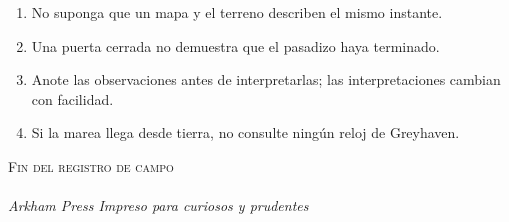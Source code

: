 \begin{enumerate}
  \item No suponga que un mapa y el terreno describen el mismo instante.
  \item Una puerta cerrada no demuestra que el pasadizo haya terminado.
  \item Anote las observaciones antes de interpretarlas; las interpretaciones cambian con facilidad.
  \item Si la marea llega desde tierra, no consulte ningún reloj de Greyhaven.
\end{enumerate}

\vfill
\begin{center}
  \textsc{Fin del registro de campo}\\[1em]
  \PulpBarcode\\[1em]
  \textit{Arkham Press \textbullet{} Impreso para curiosos y prudentes}
\end{center}
\clearpage
